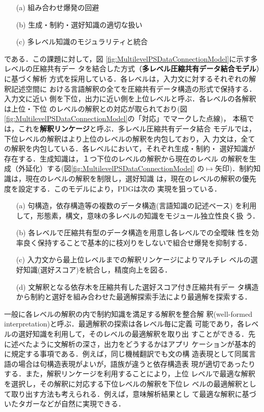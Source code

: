 \mygapskip 
\begin{itemize}
\item [(a)] 組み合わせ爆発の回避
\item [(b)] 生成・制約・選好知識の適切な扱い
\item [(c)] 多レベル知識のモジュラリティと統合
\end{itemize}
\mygapskip 

{\mynoindent}である．この課題に対して，図
\ref{fig:MultilevelPSDataConnectionModel}に示す多レベルの圧縮共有デー
タを結合した方式（{\bf 多レベル圧縮共有データ結合モデル}）に基づく解析
方式を採用している．各レベルは，入力文に対するそれぞれの解釈記述空間に
おける言語解釈の全てを圧縮共有データ構造の形式で保持する．入力文に近い
側を下位，出力に近い側を上位レベルと呼ぶ．各レベルの各解釈は上位・下位
のレベルの解釈との対応が取られており(図
\ref{fig:MultilevelPSDataConnectionModel}の「対応」でマークした点線)，
本稿では，これを{\bf 解釈リンケージ}と呼ぶ．多レベル圧縮共有データ結合
モデルでは，下位レベルの解釈はより上位のレベルの解釈を内包しており，入
力文は，全ての解釈を内包している．各レベルにおいて，それぞれ生成・制約・
選好知識が存在する．生成知識は，１つ下位のレベルの解釈から現在のレベル
の解釈を生成（外延化）する(図\ref{fig:MultilevelPSDataConnectionModel}
の$\longmapsto$矢印)．制約知識は，現在のレベルの解釈を制限し，選好知識
は，現在のレベルの解釈の優先度を設定する．このモデルにより，PDGは次の
実現を狙っている．

\begin{itemize}
\item [(a)] 句構造，依存構造等の複数のデータ構造(言語知識の記述ベース)
を利用して，形態素，構文，意味の多レベルの知識をモジュール独立性良く扱
う．
\item [(b)]各レベルで圧縮共有型のデータ構造を用意し各レベルでの全曖昧
性を効率良く保持することで基本的に枝刈りをしないで組合せ爆発を抑制する．
\item [(c)]入力文から最上位レベルまでの解釈リンケージによりマルチレ
ベルの選好知識(選好スコア)を統合し，精度向上を図る．
\item [(d)] 文解釈となる依存木を圧縮共有した選好スコア付き圧縮共有デー
タ構造から制約と選好を組み合わせた最適解探索手法により最適解を探索する．
\end{itemize}

{\mynoindent}一般に各レベルの解釈の内で制約知識を満足する解釈を整合解
釈(well-formed interpretation)と呼ぶ．最適解釈の探索は各レベル毎に定義
可能であり，各レベルの選好知識を利用して，そのレベルの最適解釈を取り出
すことができる．先に述べたように文解析の深さ，出力をどうするかはアプリ
ケーションが基本的に規定する事項である．例えば，同じ機械翻訳でも文の構
造表現として同属言語の場合は句構造表現がよいが，語族が違うと依存構造表
現が適切であったりする．また，解釈リンケージを利用することにより，上位
レベルで最適な解釈を選択し，その解釈に対応する下位レベルの解釈を下位レ
ベルの最適解釈として取り出す方法も考えられる．例えば，意味解析結果とし
て最適な解釈に基づいたタガーなどが自然に実現できる．


